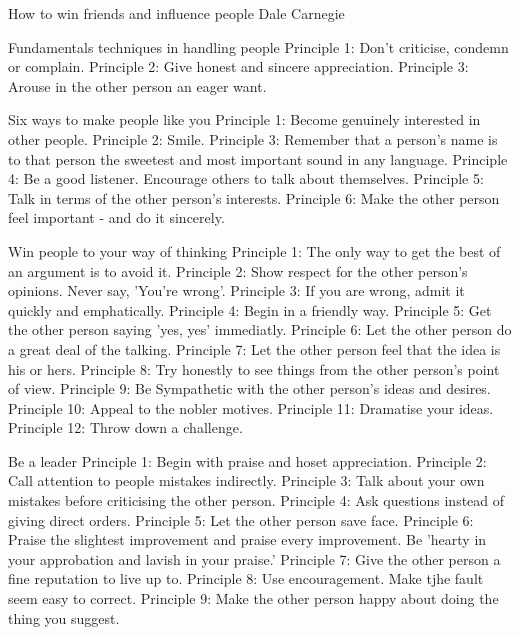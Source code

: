 How to win friends and influence people
Dale Carnegie

Fundamentals techniques in handling people
Principle 1: Don't criticise, condemn or complain.
Principle 2: Give honest and sincere appreciation.
Principle 3: Arouse in the other person an eager want.

Six ways to make people like you
Principle 1: Become genuinely interested in other people.
Principle 2: Smile.
Principle 3: Remember that a person's name is to that person the sweetest and most important sound in any language. 
Principle 4: Be a good listener. Encourage others to talk about themselves. 
Principle 5: Talk in terms of the other person's interests.
Principle 6: Make the other person feel important - and do it sincerely. 

Win people to your way of thinking
Principle 1: The only way to get the best of an argument is to avoid it.
Principle 2: Show respect for the other person's opinions. Never say, 'You're wrong'. 
Principle 3: If you are wrong, admit it quickly and emphatically. 
Principle 4: Begin in a friendly way. 
Principle 5: Get the other person saying 'yes, yes' immediatly. 
Principle 6: Let the other person do a great deal of the talking. 
Principle 7: Let the other person feel that the idea is his or hers. 
Principle 8: Try honestly to see things from the other person's point of view. 
Principle 9: Be Sympathetic with the other person's ideas and desires. 
Principle 10: Appeal to the nobler motives. 
Principle 11: Dramatise your ideas. 
Principle 12: Throw down a challenge.

Be a leader
Principle 1: Begin with praise and hoset appreciation. 
Principle 2: Call attention to people mistakes indirectly. 
Principle 3: Talk about your own mistakes before criticising the other person. 
Principle 4: Ask questions instead of giving direct orders. 
Principle 5: Let the other person save face. 
Principle 6: Praise the slightest improvement and praise every improvement. Be 'hearty in your approbation and lavish in your praise.'  
Principle 7: Give the other person a fine reputation to live up to. 
Principle 8: Use encouragement. Make tjhe fault seem easy to correct. 
Principle 9: Make the other person happy about doing the thing you suggest. 






